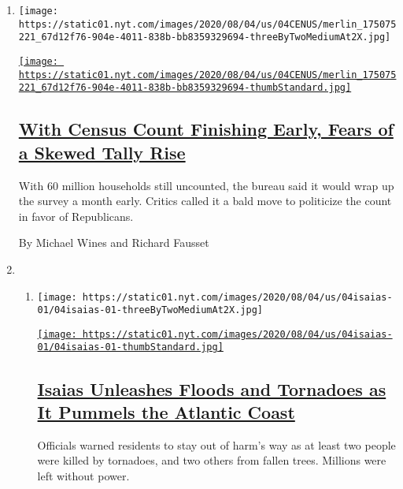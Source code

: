 \begin{enumerate}
\def\labelenumi{\arabic{enumi}.}
\item
  \texttt{[image: https://static01.nyt.com/images/2020/08/04/us/04CENUS/merlin\_175075221\_67d12f76-904e-4011-838b-bb8359329694-threeByTwoMediumAt2X.jpg]}

  \href{/2020/08/04/us/2020-census-ending-early.html}{\texttt{[image: https://static01.nyt.com/images/2020/08/04/us/04CENUS/merlin\_175075221\_67d12f76-904e-4011-838b-bb8359329694-thumbStandard.jpg]}}

  \hypertarget{with-census-count-finishing-early-fears-of-a-skewed-tally-rise}{%
  \subsection{\texorpdfstring{\href{/2020/08/04/us/2020-census-ending-early.html}{With
  Census Count Finishing Early, Fears of a Skewed Tally
  Rise}}{With Census Count Finishing Early, Fears of a Skewed Tally Rise}}\label{with-census-count-finishing-early-fears-of-a-skewed-tally-rise}}

  With 60 million households still uncounted, the bureau said it would
  wrap up the survey a month early. Critics called it a bald move to
  politicize the count in favor of Republicans.

  By Michael Wines and Richard Fausset
\item
  \begin{enumerate}
  \def\labelenumii{\arabic{enumii}.}
  \item
    \texttt{[image: https://static01.nyt.com/images/2020/08/04/us/04isaias-01/04isaias-01-threeByTwoMediumAt2X.jpg]}

    \href{/2020/08/04/us/hurricane-isaias-updates.html}{\texttt{[image: https://static01.nyt.com/images/2020/08/04/us/04isaias-01/04isaias-01-thumbStandard.jpg]}}

    \hypertarget{isaias-unleashes-floods-and-tornadoes-as-it-pummels-the-atlantic-coast}{%
    \subsection{\texorpdfstring{\href{/2020/08/04/us/hurricane-isaias-updates.html}{Isaias
    Unleashes Floods and Tornadoes as It Pummels the Atlantic
    Coast}}{Isaias Unleashes Floods and Tornadoes as It Pummels the Atlantic Coast}}\label{isaias-unleashes-floods-and-tornadoes-as-it-pummels-the-atlantic-coast}}

    Officials warned residents to stay out of harm's way as at least two
    people were killed by tornadoes, and two others from fallen trees.
    Millions were left without power.


\end{enumerate}
\end{enumerate}
